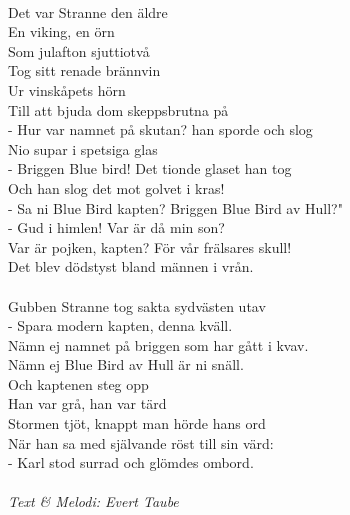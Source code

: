 \\
Det var Stranne den äldre\\
En viking, en örn\\
Som julafton sjuttiotvå\\
Tog sitt renade brännvin\\
Ur vinskåpets hörn\\
Till att bjuda dom skeppsbrutna på\\
- Hur var namnet på skutan?
han sporde och slog\\
Nio supar i spetsiga glas\\
- Briggen Blue bird!
Det tionde glaset han tog\\
Och han slog det mot golvet i kras!\\
- Sa ni Blue Bird kapten? Briggen Blue Bird av Hull?"\\
- Gud i himlen! Var är då min son?\\
Var är pojken, kapten? För vår frälsares skull!\\
Det blev dödstyst bland männen i vrån.\\
\\
Gubben Stranne tog sakta sydvästen utav\\
- Spara modern kapten, denna kväll.\\
Nämn ej namnet på briggen som har gått i kvav.\\
Nämn ej Blue Bird av Hull är ni snäll.\\
Och kaptenen steg opp\\
Han var grå, han var tärd\\
Stormen tjöt, knappt man hörde hans ord\\
När han sa med självande röst till sin värd:\\
- Karl stod surrad och glömdes ombord.\\
\\
{\footnotesize\textit{Text \& Melodi: Evert Taube}}
